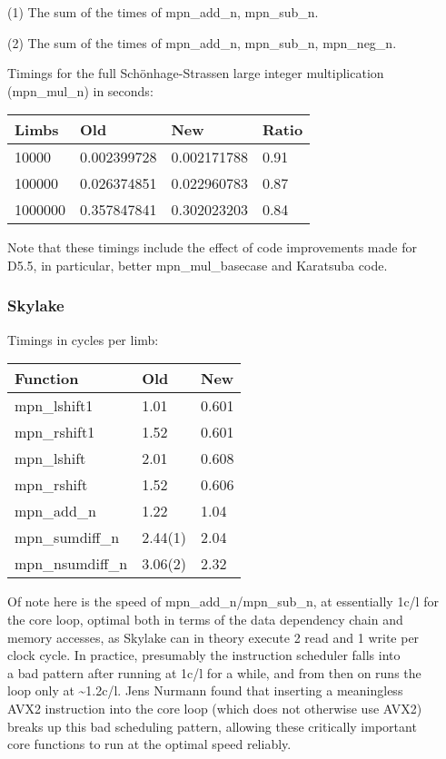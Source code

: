 (1) The sum of the times of mpn\_add\_n, mpn\_sub\_n.

(2) The sum of the times of mpn\_add\_n, mpn\_sub\_n, mpn\_neg\_n.

Timings for the full Schönhage-Strassen large integer multiplication\\
(mpn\_mul\_n) in seconds:

\begin{longtable}[c]{@{}llll@{}}
\toprule
Limbs & Old & New & Ratio\tabularnewline
\midrule
\endhead
10000 & 0.002399728 & 0.002171788 & 0.91\tabularnewline
100000 & 0.026374851 & 0.022960783 & 0.87\tabularnewline
1000000 & 0.357847841 & 0.302023203 & 0.84\tabularnewline
\bottomrule
\end{longtable}

Note that these timings include the effect of code improvements made
for\\
D5.5, in particular, better mpn\_mul\_basecase and Karatsuba code.

\subsubsection{Skylake}\label{skylake}

Timings in cycles per limb:

\begin{longtable}[c]{@{}lll@{}}
\toprule
Function & Old & New\tabularnewline
\midrule
\endhead
mpn\_lshift1 & 1.01 & 0.601\tabularnewline
mpn\_rshift1 & 1.52 & 0.601\tabularnewline
mpn\_lshift & 2.01 & 0.608\tabularnewline
mpn\_rshift & 1.52 & 0.606\tabularnewline
mpn\_add\_n & 1.22 & 1.04\tabularnewline
mpn\_sumdiff\_n & 2.44(1) & 2.04\tabularnewline
mpn\_nsumdiff\_n & 3.06(2) & 2.32\tabularnewline
\bottomrule
\end{longtable}

Of note here is the speed of mpn\_add\_n/mpn\_sub\_n, at essentially
1c/l for\\
the core loop, optimal both in terms of the data dependency chain and\\
memory accesses, as Skylake can in theory execute 2 read and 1 write
per\\
clock cycle. In practice, presumably the instruction scheduler falls
into\\
a bad pattern after running at 1c/l for a while, and from then on runs
the\\
loop only at \textasciitilde{}1.2c/l. Jens Nurmann found that inserting
a meaningless\\
AVX2 instruction into the core loop (which does not otherwise use
AVX2)\\
breaks up this bad scheduling pattern, allowing these critically
important\\
core functions to run at the optimal speed reliably.

